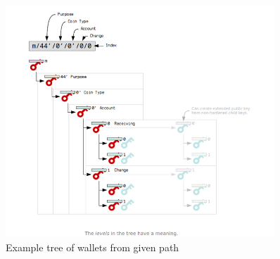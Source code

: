\begin{figure}[ht!]
    \centering
    \includegraphics[width=0.9\textwidth]{images/bip44.png}
    \caption[Example tree of wallets from given path]{Example tree of wallets from given path}
    \label{fig:bip44}
\end{figure}

